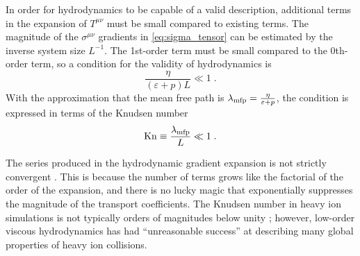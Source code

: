 

In order for hydrodynamics to be capable of a valid description, additional terms in the expansion of $T^{\mu\nu}$ must be small compared to existing terms.
The magnitude of the $\sigma^{\mu\nu}$ gradients in \cref{eq:sigma_tensor} can be estimated by the inverse system size $L^{-1}$.
The 1st-order term must be small compared to the 0th-order term, so a condition for the validity of hydrodynamics is \cite{Romatschke:2017ejr} %
\begin{equation}
  \frac{\eta}{(\varepsilon + p)L} \ll 1 \;.
\end{equation}
With the approximation that the mean free path is \(\lambda_\textrm{mfp} = \frac{\eta}{\varepsilon + p} \), the condition is expressed in terms of the Knudsen number
\begin{equation}
  \mathrm{Kn} \equiv \frac{\lambda_\textrm{mfp}}{L} \ll 1 \;.
\end{equation}

The series produced in the hydrodynamic gradient expansion is not strictly convergent \cite{Denicol:2016bjh}.
This is because the number of terms grows like the factorial of the order of the expansion, and there is no lucky magic that exponentially suppresses the magnitude of the transport coefficients.
The Knudsen number in heavy ion simulations is not typically orders of magnitudes below unity \cite{Niemi:2014wta}; however, low-order viscous hydrodynamics has had ``unreasonable success'' at describing many global properties of heavy ion collisions.


